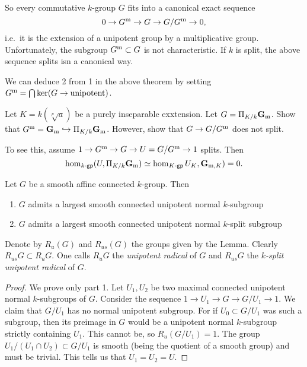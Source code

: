 \documentclass{article}
\begin{document}
So every commutative $k$-group $G$ fits into a canonical exact sequence 
\[
  0 \to G^{\mathrm{m}} \to G \to G/G^{\mathrm{m}} \to 0 ,
\]
i.e.\ it is the extension of a unipotent group by a multiplicative group. 
Unfortunately, the subgroup $G^{\mathrm{m}}\subset G$ is not characteristic. If $k$ 
is split, the above sequence splits isn a canonical way. 

We can deduce 2 from 1 in the above theorem by setting 
$G^{\mathrm{m}}=\bigcap \ker(G\to \text{unipotent})$. 

\begin{exercise}
Let $K=k(\sqrt[p] a)$ be a purely inseparable exxtension. Let 
$G=\Pi_{K/k}\mathbf{G}_{\mathrm{m}}$. Show that $G^{\mathrm{m}} = \mathbf{G}_{\mathrm{m}} \hookrightarrow \Pi_{K/k} \mathbf{G}_{\mathrm{m}}$. However, show that $G\to G/G^{\mathrm{m}}$ does not split. 
\end{exercise}

To see this, assume $1 \to G^{\mathrm{m}} \to G \to U=G/G^{\mathrm{m}}\to 1$ splits. Then 
\[
  \hom_{k\textnormal{-}\mathsf{gp}}(U,\Pi_{K/k} \mathbf{G}_{\mathrm{m}}) \simeq \hom_{K\textnormal{-}\mathsf{gp}} U_K, \mathbf{G}_{\mathrm{m},K}) = 0. 
\]

\begin{lemma}
Let $G$ be a smooth affine connected $k$-group. Then 
\begin{enumerate}
  \item $G$ admits a largest smooth connected unipotent normal $k$-subgroup 
  \item $G$ admits a largest smooth connected unipotent normal $k$-split 
    subgroup 
\end{enumerate}
\end{lemma}

Denote by $R_u(G)$ and $R_{u s}(G)$ the groups given by the Lemma. Clearly 
$R_{us} G\subset R_u G$. One calls $R_u G$ the \emph{unipotent radical} of 
$G$ and $R_{us} G$ the \emph{$k$-split unipotent radical} of $G$. 

\begin{proof}
We prove only part 1. Let $U_1,U_2$ be two maximal connected unipotent normal $k$-subgroups of 
$G$. Consider the sequence $1 \to U_1 \to G \to G/U_1\to 1$. We claim that 
$G/U_1$ has no normal unipotent subgroup. For if 
$U_0\subset G/U_1$ was such a subgroup, then its preimage in 
$G$ would be a unipotent normal $k$-subgroup strictly containing $U_1$. 
This cannot be, so $R_u (G/U_1) = 1$. The group $U_1/(U_1\cap U_2)\subset G/U_1$ 
is smooth (being the quotient of a smooth group) and must be trivial. This tells 
us that $U_1=U_2=U$. 
\end{proof}
\end{document}
